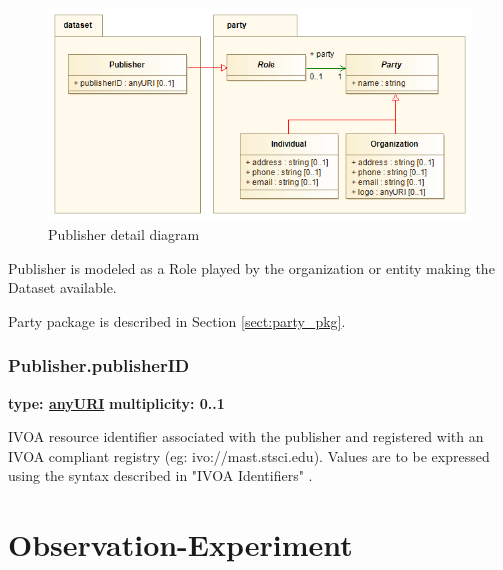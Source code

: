   \begin{figure}[h]
  \begin{center}
    \includegraphics[width=4.75in]{diagrams/Publisher.png}
    \caption{ Publisher detail diagram}\label{fig:publisher}
  \end{center}
  \end{figure}

  Publisher is modeled as a Role played by the organization or entity making the
  Dataset available.

  Party package is described in Section \ref{sect:party_pkg}.

  \subsubsection{Publisher.publisherID}
  \textbf{type: \hyperref[sect:ivoa]{anyURI}} \newline
  \textbf{multiplicity: 0..1} \newline
  
  IVOA resource identifier associated with the publisher and registered with an
  IVOA compliant registry (eg: ivo://mast.stsci.edu). Values are to be expressed
  using the syntax described in "IVOA Identifiers" \citep{2007ivoa.spec.0314P}.
  
\pagebreak
\section{Observation-Experiment}
\label{sect:obs}

